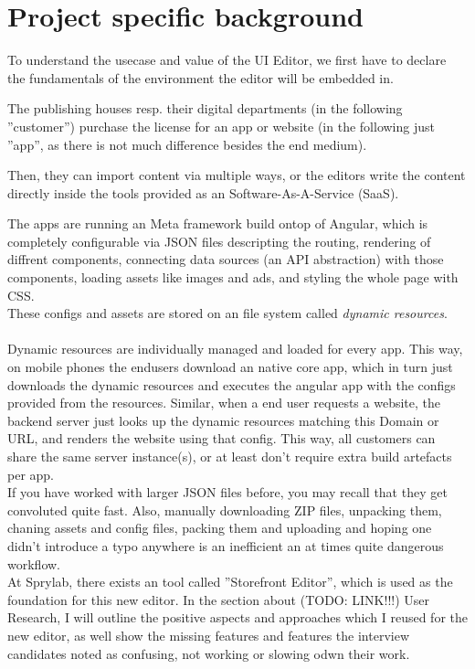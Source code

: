 \section{Project specific background}
To understand the usecase and value of the UI Editor, we first have to declare the fundamentals of the environment the editor will be embedded in.

The publishing houses resp. their digital departments (in the following ''customer'') purchase the license for an app or website (in the following just ''app'', as there is not much difference besides the end medium).

Then, they can import content via multiple ways, or the editors write the content directly inside the tools provided as an Software-As-A-Service (SaaS).

The apps are running an Meta framework build ontop of Angular, which is completely configurable via JSON files descripting the routing, rendering of diffrent components,
connecting data sources (an API abstraction) with those components, loading assets like images and ads, and styling the whole page with CSS.
\\
These configs and assets are stored on an file system called \label{def:DynamicResources} \textit{dynamic resources}.
\\\\
Dynamic resources are individually managed and loaded for every app. This way, on mobile phones the endusers download an native core app, which in turn just downloads the dynamic resources and executes the angular app with the configs provided from the resources.
Similar, when a end user requests a website, the backend server just looks up the dynamic resources matching this Domain or URL, and renders the website using that config.
This way, all customers can share the same server instance(s), or at least don't require extra build artefacts per app.
\\
If you have worked with larger JSON files before, you may recall that they get convoluted quite fast.
Also, manually downloading ZIP files, unpacking them, chaning assets and config files, packing them and uploading and hoping one didn't introduce a typo anywhere is an inefficient an at times quite dangerous workflow.
\\
At Sprylab, there exists an tool called ''Storefront Editor'', which is used as the foundation for this new editor.
In the section about (TODO: LINK!!!) User Research, I will outline the positive aspects and approaches which I reused for the new editor,
as well show the missing features and features the interview candidates noted as confusing, not working or slowing odwn their work.